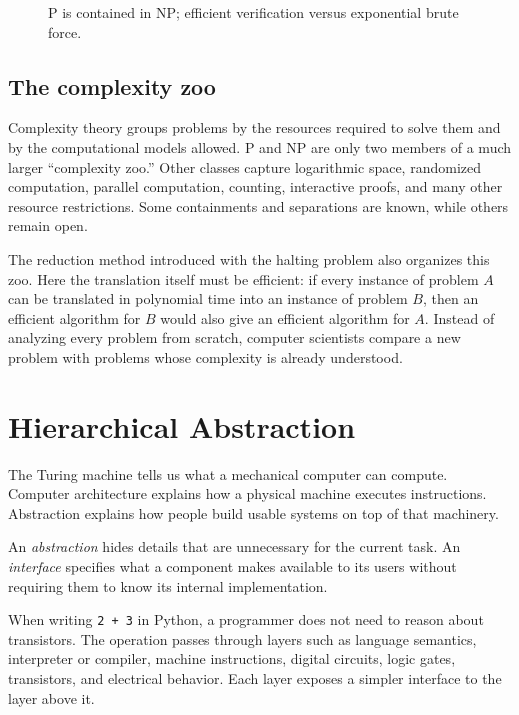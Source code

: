 \documentclass[11pt]{article}
\begin{document}
\begin{figure}[htbp]
  \centering
  
  \caption{P is contained in NP; efficient verification versus exponential brute force.}
\end{figure}

\subsection{The complexity zoo}

Complexity theory groups problems by the resources required to solve them and
by the computational models allowed. P and NP are only two members of a much
larger ``complexity zoo.'' Other classes capture logarithmic space, randomized
computation, parallel computation, counting, interactive proofs, and many other
resource restrictions. Some containments and separations are known, while
others remain open.

The reduction method introduced with the halting problem also organizes this
zoo. Here the translation itself must be efficient: if every instance of
problem $A$ can be translated in polynomial time into an instance of problem
$B$, then an efficient algorithm for $B$ would also give an efficient algorithm
for $A$. Instead of analyzing every problem from scratch, computer scientists
compare a new problem with problems whose complexity is already understood.

\section{Hierarchical Abstraction}

The Turing machine tells us what a mechanical computer can compute. Computer architecture explains how a physical machine executes instructions. Abstraction explains how people build usable systems on top of that machinery.

\begin{definition}
An \emph{abstraction} hides details that are unnecessary for the current task. An \emph{interface} specifies what a component makes available to its users without requiring them to know its internal implementation.
\end{definition}

When writing \texttt{2 + 3} in Python, a programmer does not need to reason about transistors. The operation passes through layers such as language semantics, interpreter or compiler, machine instructions, digital circuits, logic gates, transistors, and electrical behavior. Each layer exposes a simpler interface to the layer above it.
\end{document}
